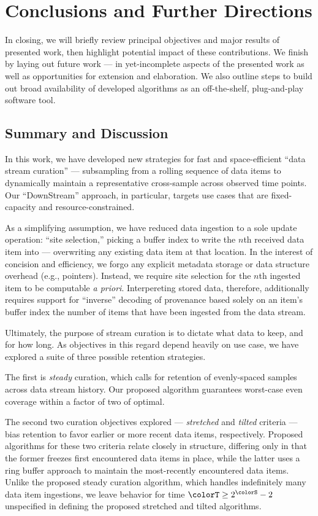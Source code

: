 \section{Conclusions and Further Directions} \label{sec:conclusion}

In closing, we will briefly review principal objectives and major results of presented work, then highlight potential impact of these contributions.
We finish by laying out future work --- in yet-incomplete aspects of the presented work as well as opportunities for extension and elaboration.
We also outline steps to build out broad availability of developed algorithms as an off-the-shelf, plug-and-play software tool.

\subsection{Summary and Discussion}

In this work, we have developed new strategies for fast and space-efficient ``data stream curation'' --- subsampling from a rolling sequence of data items to dynamically maintain a representative cross-sample across observed time points.
Our ``DownStream'' approach, in particular, targets use cases that are fixed-capacity and resource-constrained.

As a simplifying assumption, we have reduced data ingestion to a sole update operation: ``site selection,'' picking a buffer index to write the $n$th received data item into --- overwriting any existing data item at that location.
In the interest of concision and efficiency, we forgo any explicit metadata storage or data structure overhead (e.g., pointers).
Instead, we require site selection for the $n$th ingested item to be computable \textit{a priori}.
Interpereting stored data, therefore, additionally requires support for ``inverse'' decoding of provenance based solely on an item's buffer index the number of items that have been ingested from the data stream.

Ultimately, the purpose of stream curation is to dictate what data to keep, and for how long.
As objectives in this regard depend heavily on use case, we have explored a suite of three possible retention strategies.

The first is \textit{steady} curation, which calls for retention of evenly-spaced samples across data stream history.
Our proposed algorithm guarantees worst-case even coverage within a factor of two of optimal.

The second two curation objectives explored --- \textit{stretched} and \textit{tilted} criteria --- bias retention to favor earlier or more recent data items, respectively.
Proposed algorithms for these two criteria relate closely in structure, differing only in that the former freezes first encountered data items in place, while the latter uses a ring buffer approach to maintain the most-recently encountered data items.
Unlike the proposed steady curation algorithm, which handles indefinitely many data item ingestions, we leave behavior for time $\colorT \geq 2^{\colorS} - 2$ unspecified in defining the proposed stretched and tilted algorithms.

